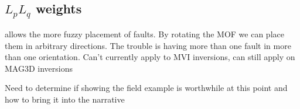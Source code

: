 \subsection{$L_p L_q$ weights}
\label{sec:Lp Lq weights:ElPoma}

allows the more fuzzy placement of faults. By rotating the \ac{MOF} we can place them in arbitrary directions. The trouble is having more than one fault in more than one orientation. Can't currently apply to MVI inversions, can still apply on MAG3D inversions 

Need to determine if showing the field example is worthwhile at this point and how to bring it into the narrative

\endinput




Any text after an \endinput is ignored.
You could put scraps here or things in progress.
